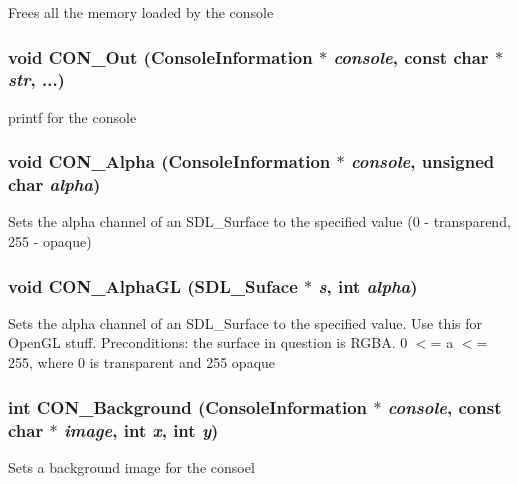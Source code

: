 Frees all the memory loaded by the console 
\subsubsection{\setlength{\rightskip}{0pt plus 5cm}void CON\_\-Out ({\bf Console\-Information} $\ast$ {\em console}, const char $\ast$ {\em str}, ...)}\label{CON__console_8h_a18}


printf for the console 
\subsubsection{\setlength{\rightskip}{0pt plus 5cm}void CON\_\-Alpha ({\bf Console\-Information} $\ast$ {\em console}, unsigned char {\em alpha})}\label{CON__console_8h_a19}


Sets the alpha channel of an SDL\_\-Surface to the specified value (0 - transparend, 255 - opaque) 
\subsubsection{\setlength{\rightskip}{0pt plus 5cm}void CON\_\-Alpha\-GL (SDL\_\-Suface $\ast$ {\em s}, int {\em alpha})}\label{CON__console_8h_a20}


Sets the alpha channel of an SDL\_\-Surface to the specified value. Use this for Open\-GL stuff. Preconditions: the surface in question is RGBA. 0 $<$= a $<$= 255, where 0 is transparent and 255 opaque 
\subsubsection{\setlength{\rightskip}{0pt plus 5cm}int CON\_\-Background ({\bf Console\-Information} $\ast$ {\em console}, const char $\ast$ {\em image}, int {\em x}, int {\em y})}\label{CON__console_8h_a21}


Sets a background image for the consoel 
